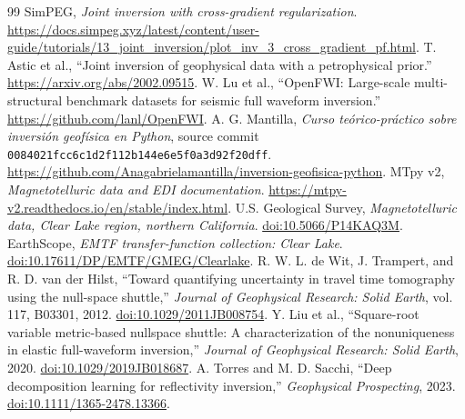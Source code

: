 \documentclass[11pt]{article}
\begin{document}
\begin{thebibliography}{99}
 SimPEG, \emph{Joint inversion with cross-gradient regularization}. \url{https://docs.simpeg.xyz/latest/content/user-guide/tutorials/13_joint_inversion/plot_inv_3_cross_gradient_pf.html}.
 T. Astic et al., ``Joint inversion of geophysical data with a petrophysical prior.'' \url{https://arxiv.org/abs/2002.09515}.
 W. Lu et al., ``OpenFWI: Large-scale multi-structural benchmark datasets for seismic full waveform inversion.'' \url{https://github.com/lanl/OpenFWI}.
 A. G. Mantilla, \emph{Curso te\'orico-pr\'actico sobre inversi\'on geof\'isica en Python}, source commit \texttt{0084021fcc6c1d2f112b144e6e5f0a3d92f20dff}. \url{https://github.com/Anagabrielamantilla/inversion-geofisica-python}.
 MTpy v2, \emph{Magnetotelluric data and EDI documentation}. \url{https://mtpy-v2.readthedocs.io/en/stable/index.html}.
 U.S. Geological Survey, \emph{Magnetotelluric data, Clear Lake region, northern California}. \href{https://doi.org/10.5066/P14KAQ3M}{doi:10.5066/P14KAQ3M}.
 EarthScope, \emph{EMTF transfer-function collection: Clear Lake}. \href{https://doi.org/10.17611/DP/EMTF/GMEG/Clearlake}{doi:10.17611/DP/EMTF/GMEG/Clearlake}.
 R. W. L. de Wit, J. Trampert, and R. D. van der Hilst, ``Toward quantifying uncertainty in travel time tomography using the null-space shuttle,'' \emph{Journal of Geophysical Research: Solid Earth}, vol. 117, B03301, 2012. \href{https://doi.org/10.1029/2011JB008754}{doi:10.1029/2011JB008754}.
 Y. Liu et al., ``Square-root variable metric-based nullspace shuttle: A characterization of the nonuniqueness in elastic full-waveform inversion,'' \emph{Journal of Geophysical Research: Solid Earth}, 2020. \href{https://doi.org/10.1029/2019JB018687}{doi:10.1029/2019JB018687}.
 A. Torres and M. D. Sacchi, ``Deep decomposition learning for reflectivity inversion,'' \emph{Geophysical Prospecting}, 2023. \href{https://doi.org/10.1111/1365-2478.13366}{doi:10.1111/1365-2478.13366}.


\end{thebibliography}
\end{document}
